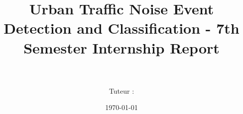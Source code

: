 \title{Urban Traffic Noise Event Detection and Classification - 7th Semester Internship Report\\ \vspace{0.5cm} \LARGE{\textbf{\projecttitle}} \vspace{0.75cm}}
\author{\students \\ \vspace{1cm} \\ Tuteur : \tutor}
\date{\today}